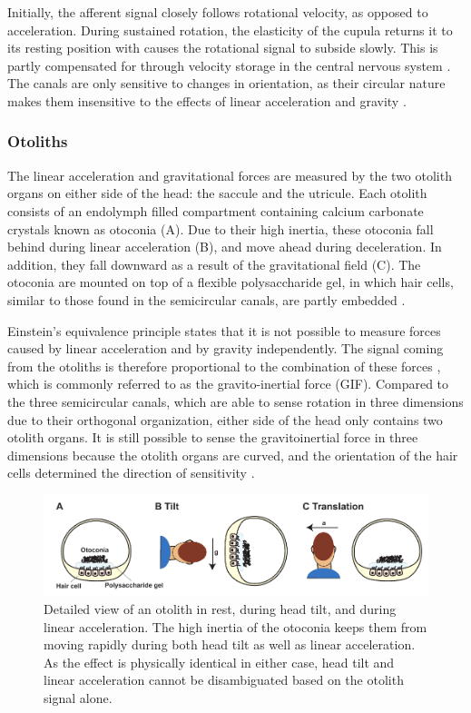 Initially, the afferent signal closely follows rotational velocity, as opposed to acceleration. During sustained rotation, the elasticity of the cupula returns it to its resting position with causes the rotational signal to subside slowly. This is partly compensated for through velocity storage in the central nervous system \cite{goldberg2012}. The canals are only sensitive to changes in orientation, as their circular nature makes them insensitive to the effects of linear acceleration and gravity \cite{goldberg2012}. 


\subsubsection{Otoliths}
The linear acceleration and gravitational forces are measured by the two otolith organs on either side of the head: the saccule and the utricule. Each otolith consists of an endolymph filled compartment containing calcium carbonate crystals known as otoconia (A). Due to their high inertia, these otoconia fall behind during linear acceleration (B), and move ahead during deceleration. In addition, they fall downward as a result of the gravitational field (C). The otoconia are mounted on top of a flexible polysaccharide gel, in which hair cells, similar to those found in the semicircular canals, are partly embedded \cite{goldberg2012}.  

Einstein's equivalence principle states that  it is not possible to measure forces caused by linear acceleration and by gravity independently. The signal coming from the otoliths is therefore proportional to the combination of these forces \cite{fernandez1976b}, which is commonly referred to as the gravito-inertial force (GIF). Compared to the three semicircular canals, which are able to sense rotation in three dimensions due to their orthogonal organization, either side of the head only contains two otolith organs. It is still possible to sense the gravitoinertial force in three dimensions because the otolith organs are curved, and the orientation of the hair cells determined the direction of sensitivity \cite{goldberg2012}.

\begin{figure}
    \includegraphics[width=1.0\textwidth]{src/intro/figures/otoliths.pdf}
    \caption{Detailed view of an otolith  in rest,  during head tilt, and  during linear acceleration. The high inertia of the otoconia keeps them from moving rapidly during both head tilt as well as linear acceleration. As the effect is physically identical in either case, head tilt and linear acceleration cannot be disambiguated based on the otolith signal alone.}
    \label{intro:fig:otoliths}
\end{figure}


